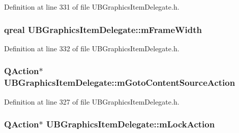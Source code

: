Definition at line 331 of file U\-B\-Graphics\-Item\-Delegate.\-h.

\hypertarget{class_u_b_graphics_item_delegate_ae7c03f2f6e86504ca5ae7a9b2d8a74f0}{
\subsubsection[{m\-Frame\-Width}]{\setlength{\rightskip}{0pt plus 5cm}qreal U\-B\-Graphics\-Item\-Delegate\-::m\-Frame\-Width\hspace{0.3cm}{\ttfamily [protected]}}}\label{dd/dd5/class_u_b_graphics_item_delegate_ae7c03f2f6e86504ca5ae7a9b2d8a74f0}


Definition at line 332 of file U\-B\-Graphics\-Item\-Delegate.\-h.

\hypertarget{class_u_b_graphics_item_delegate_a9a521276a587e652033769498837deec}{
\subsubsection[{m\-Goto\-Content\-Source\-Action}]{\setlength{\rightskip}{0pt plus 5cm}Q\-Action$\ast$ U\-B\-Graphics\-Item\-Delegate\-::m\-Goto\-Content\-Source\-Action\hspace{0.3cm}{\ttfamily [protected]}}}\label{dd/dd5/class_u_b_graphics_item_delegate_a9a521276a587e652033769498837deec}


Definition at line 327 of file U\-B\-Graphics\-Item\-Delegate.\-h.

\hypertarget{class_u_b_graphics_item_delegate_a8003eac64477c1c5ed3e80ae72f1b3dc}{
\subsubsection[{m\-Lock\-Action}]{\setlength{\rightskip}{0pt plus 5cm}Q\-Action$\ast$ U\-B\-Graphics\-Item\-Delegate\-::m\-Lock\-Action\hspace{0.3cm}{\ttfamily [protected]}}}\label{dd/dd5/class_u_b_graphics_item_delegate_a8003eac64477c1c5ed3e80ae72f1b3dc}


